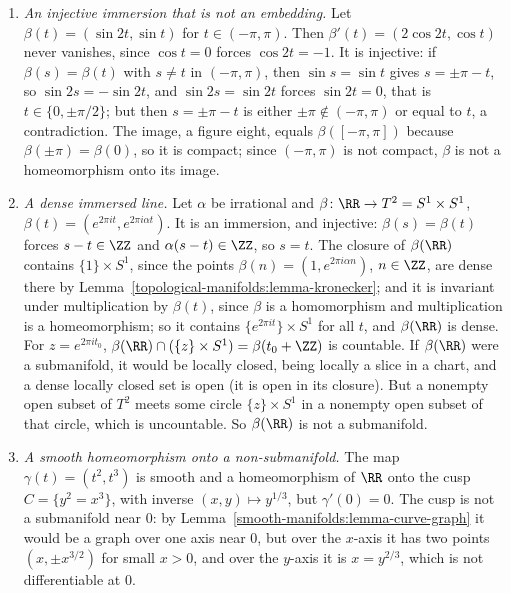 \begin{counterexample}\label{smooth-manifolds:counterexample-immersions}
\begin{enumerate}
\item \emph{An injective immersion that is not an embedding.} Let $\beta(t) = (\sin 2t, \sin t)$ for $t \in (-\pi, \pi)$. Then $\beta'(t) = (2\cos 2t, \cos t)$ never vanishes, since $\cos t = 0$ forces $\cos 2t = -1$. It is injective: if
$\beta(s) = \beta(t)$ with $s \neq t$ in $(-\pi, \pi)$, then $\sin s = \sin t$ gives $s = \pm\pi - t$, so $\sin 2s = -\sin 2t$, and $\sin 2s = \sin 2t$ forces $\sin 2t = 0$, that is $t \in \{0, \pm\pi/2\}$; but then $s = \pm\pi - t$
is either $\pm\pi \notin (-\pi, \pi)$ or equal to $t$, a contradiction. The image, a figure
eight, equals $\beta([-\pi, \pi])$ because $\beta(\pm\pi) = \beta(0)$, so it is compact; since $(-\pi, \pi)$ is not compact, $\beta$ is not a homeomorphism onto its image.
\item \emph{A dense immersed line.} Let $\alpha$ be irrational and $\beta \colon \RR \to T^2 = S^1 \times S^1$, $\beta(t) = (e^{2\pi it}, e^{2\pi i\alpha t})$. It is an immersion, and injective: $\beta(s) = \beta(t)$ forces $s - t \in \ZZ$ and
$\alpha(s - t) \in \ZZ$, so $s = t$. The closure of $\beta(\RR)$ contains $\{1\} \times S^1$, since the points $\beta(n) = (1, e^{2\pi i\alpha n})$, $n \in \ZZ$, are dense there by Lemma~\ref{topological-manifolds:lemma-kronecker}; and it is
invariant under multiplication by $\beta(t)$, since $\beta$ is a homomorphism and multiplication is a homeomorphism; so it contains $\{e^{2\pi it}\} \times S^1$ for all $t$, and $\beta(\RR)$ is dense. For $z = e^{2\pi it_0}$,
$\beta(\RR) \cap (\{z\} \times S^1) = \beta(t_0 + \ZZ)$ is countable. If $\beta(\RR)$ were a submanifold, it would be locally closed, being locally a slice in a chart, and a dense locally closed set is open (it is open in its
closure). But a nonempty open subset of $T^2$ meets some circle $\{z\} \times S^1$ in a nonempty open subset of that circle, which is uncountable. So $\beta(\RR)$ is not a submanifold.
\item \emph{A smooth homeomorphism onto a non-submanifold.} The map $\gamma(t) = (t^2, t^3)$ is smooth and a homeomorphism of $\RR$ onto the cusp $C = \{y^2 = x^3\}$, with inverse $(x, y) \mapsto y^{1/3}$, but $\gamma'(0) = 0$. The cusp is
not a submanifold near $0$: by Lemma~\ref{smooth-manifolds:lemma-curve-graph} it would be a graph over one axis near $0$, but over the $x$-axis it has two points $(x, \pm x^{3/2})$ for small $x > 0$, and over the $y$-axis it is
$x = y^{2/3}$, which is not differentiable at $0$.
\end{enumerate}
\end{counterexample}

